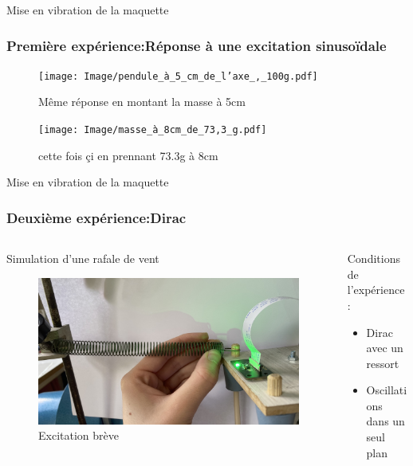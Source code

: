 \documentclass{beamer}
\begin{document}
	
	\begin{frame}{Mise en vibration de la maquette}
		\frametitle{Première expérience:Réponse à une excitation sinusoïdale}	
		\centering
		\begin{figure}
			\texttt{[image: Image/pendule\_à\_5\_cm\_de\_l'axe\_,\_100g.pdf]}
			\caption{Même réponse en montant la masse à 5cm}
		\end{figure}
			
		\centering
		\begin{figure}
			\texttt{[image: Image/masse\_à\_8cm\_de\_73,3\_g.pdf]}
			\caption{cette fois çi en prennant 73.3g à 8cm}
		\end{figure}
		
		
		
	\end{frame}
	
	
	
	
	\begin{frame}{Mise en vibration de la maquette}
		\frametitle{Deuxième expérience:Dirac}
		\subtitle{bjr}
		\begin{columns}
			\begin{column}{0.5\textwidth}
				\alert{Simulation d'une rafale de vent}
				\begin{figure}
					\includegraphics[width=\textwidth]{Image/Montage dirac.jpg}
					\caption{Excitation brève}
				\end{figure}
			\end{column}
			\begin{column}{0.5\textwidth}
				Conditions de l'expérience :
				\begin{itemize}
					\item Dirac avec un ressort 
					\item Oscillations dans un seul plan
				\end{itemize}	
			\end{column}
		\end{columns}
	\end{frame}
	
\end{document}
